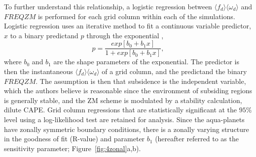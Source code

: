 \documentclass[times]{qjrms4}
\begin{document}
To further understand this relationship, a logistic regression between $\langle f_{d} \rangle \langle \omega_{d} \rangle$ and $FREQZM$ is performed for each grid column within each of the simulations. Logistic regression uses an iterative method to fit a continuous variable predictor, $x$ to a binary predictand $p$ through the exponential \citep{WILKSBOOK},
\begin{equation}
p = \frac{exp{[b_0 + b_1 x]}}{1 + exp{[b_0 + b_1 x]}}, \label{eq:eq6-3}
\end{equation}
where $b_0$ and $b_1$ are the shape parameters of the exponential. The predictor is then the instantaneous $\langle f_{d} \rangle \langle \omega_{d} \rangle$ of a grid column, and the predictand the binary $FREQZM$. The assumption is then that subsidence is the independent variable, which the authors believe is reasonable since the environment of subsiding regions is generally stable, and the ZM scheme is modulated by a stability calculation, dilute CAPE. Grid column regressions that are statistically significant at the $95\%$ level using a log-likelihood test \citep{WILKSBOOK} are retained for analysis. Since the aqua-planets have zonally symmetric boundary conditions, there is a zonally varying structure in the goodness of fit (R-value) and parameter $b_1$ (hereafter referred to as the sensitivity parameter; Figure~\ref{fig:4zonal}a,b).
\end{document}
